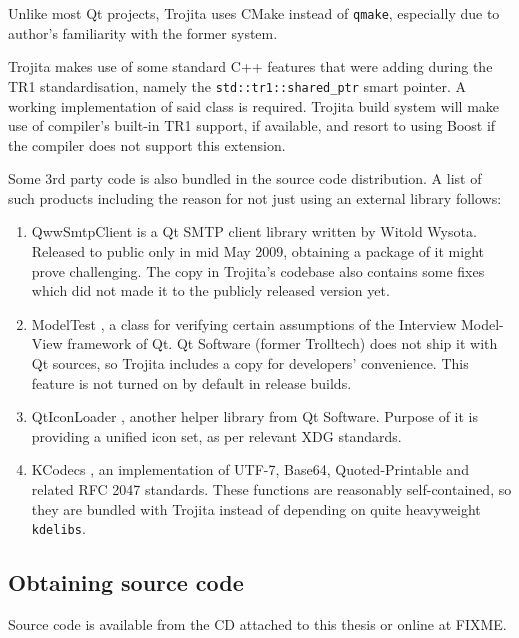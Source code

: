 \documentclass[12pt,notitlepage]{report}
\newcommand{\trojita}{Trojita\xspace}
\begin{document}
Unlike most Qt projects, \trojita uses CMake \cite{cmake} instead of {\tt qmake},
especially due to author's familiarity with the former system.

\trojita makes use of some standard C++ features that were adding during the TR1
\cite{std-tr1} standardisation, namely the {\tt std::tr1::shared\_ptr} smart
pointer. A working implementation of said class is required.  \trojita build
system will make use of compiler's built-in TR1 support, if available, and
resort to using Boost if the compiler does not support this extension.

Some 3rd party code is also bundled in the source code distribution.  A list of
such products including the reason for not just using an external library
follows:

\begin{enumerate}
    \item{QwwSmtpClient \cite{qwwsmtpclient} is a Qt SMTP client library written
        by Witold Wysota.  Released to public only in mid May 2009, obtaining a
        package of it might prove challenging.  The copy in \trojita's codebase
        also contains some fixes which did not made it to the publicly released
        version yet.}
    \item{ModelTest \cite{modeltest}, a class for verifying certain assumptions
        of the Interview Model-View framework of Qt.  Qt Software (former
        Trolltech) does not ship it with Qt sources, so \trojita includes a copy
        for developers' convenience.  This feature is not turned on by default
        in release builds.}
    \item{QtIconLoader \cite{qticonloader}, another helper library from Qt
        Software.  Purpose of it is providing a unified icon set, as per
        relevant XDG standards.}
    \item{KCodecs \cite{kcodecs}, an implementation of UTF-7, Base64,
        Quoted-Printable and related RFC 2047 standards.  These functions are
        reasonably self-contained, so they are bundled with \trojita instead of
        depending on quite heavyweight {\tt kdelibs}.}
\end{enumerate}

\subsection{Obtaining source code}

Source code is available from the CD attached to this thesis or online at FIXME.
\end{document}
